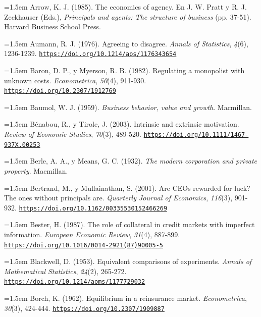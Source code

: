 \documentclass[10pt,a4paper]{article}
\begin{document}
\noindent\hangindent=1.5em Arrow, K. J. (1985). The economics of agency. En J. W. Pratt y R. J. Zeckhauser (Eds.), \textit{Principals and agents: The structure of business} (pp. 37-51). Harvard Business School Press.

\noindent\hangindent=1.5em Aumann, R. J. (1976). Agreeing to disagree. \textit{Annals of Statistics}, \textit{4}(6), 1236-1239. \href{https://doi.org/10.1214/aos/1176343654}{\nolinkurl{https://doi.org/10.1214/aos/1176343654}}

\noindent\hangindent=1.5em Baron, D. P., y Myerson, R. B. (1982). Regulating a monopolist with unknown costs. \textit{Econometrica}, \textit{50}(4), 911-930. \href{https://doi.org/10.2307/1912769}{\nolinkurl{https://doi.org/10.2307/1912769}}

\noindent\hangindent=1.5em Baumol, W. J. (1959). \textit{Business behavior, value and growth}. Macmillan.

\noindent\hangindent=1.5em Bénabou, R., y Tirole, J. (2003). Intrinsic and extrinsic motivation. \textit{Review of Economic Studies}, \textit{70}(3), 489-520. \href{https://doi.org/10.1111/1467-937X.00253}{\nolinkurl{https://doi.org/10.1111/1467-937X.00253}}

\noindent\hangindent=1.5em Berle, A. A., y Means, G. C. (1932). \textit{The modern corporation and private property}. Macmillan.

\noindent\hangindent=1.5em Bertrand, M., y Mullainathan, S. (2001). Are CEOs rewarded for luck? The ones without principals are. \textit{Quarterly Journal of Economics}, \textit{116}(3), 901-932. \href{https://doi.org/10.1162/00335530152466269}{\nolinkurl{https://doi.org/10.1162/00335530152466269}}

\noindent\hangindent=1.5em Bester, H. (1987). The role of collateral in credit markets with imperfect information. \textit{European Economic Review}, \textit{31}(4), 887-899. \href{https://doi.org/10.1016/0014-2921(87)90005-5}{\nolinkurl{https://doi.org/10.1016/0014-2921(87)90005-5}}

\noindent\hangindent=1.5em Blackwell, D. (1953). Equivalent comparisons of experiments. \textit{Annals of Mathematical Statistics}, \textit{24}(2), 265-272. \href{https://doi.org/10.1214/aoms/1177729032}{\nolinkurl{https://doi.org/10.1214/aoms/1177729032}}

\noindent\hangindent=1.5em Borch, K. (1962). Equilibrium in a reinsurance market. \textit{Econometrica}, \textit{30}(3), 424-444. \href{https://doi.org/10.2307/1909887}{\nolinkurl{https://doi.org/10.2307/1909887}}
\end{document}
